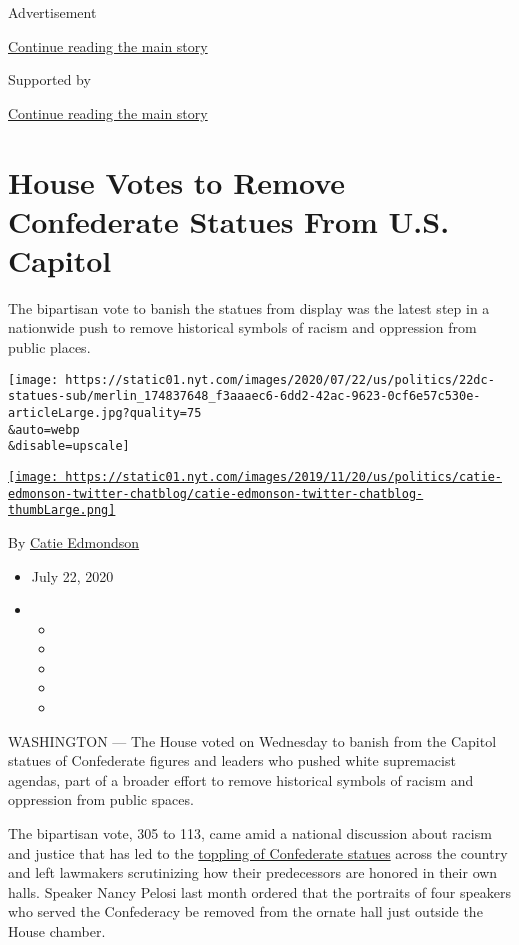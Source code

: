 Advertisement

\protect\hyperlink{after-top}{Continue reading the main story}

Supported by

\protect\hyperlink{after-sponsor}{Continue reading the main story}

\hypertarget{house-votes-to-remove-confederate-statues-from-us-capitol}{%
\section{House Votes to Remove Confederate Statues From U.S.
Capitol}\label{house-votes-to-remove-confederate-statues-from-us-capitol}}

The bipartisan vote to banish the statues from display was the latest
step in a nationwide push to remove historical symbols of racism and
oppression from public places.

\texttt{[image: https://static01.nyt.com/images/2020/07/22/us/politics/22dc-statues-sub/merlin\_174837648\_f3aaaec6-6dd2-42ac-9623-0cf6e57c530e-articleLarge.jpg?quality=75\\\&auto=webp\\\&disable=upscale]}

\href{https://www.nytimes.com/by/catie-edmondson}{\texttt{[image: https://static01.nyt.com/images/2019/11/20/us/politics/catie-edmonson-twitter-chatblog/catie-edmonson-twitter-chatblog-thumbLarge.png]}}

By \href{https://www.nytimes.com/by/catie-edmondson}{Catie Edmondson}

\begin{itemize}
\item
  July 22, 2020
\item
  \begin{itemize}
  \item
  \item
  \item
  \item
  \item
  \end{itemize}
\end{itemize}

WASHINGTON --- The House voted on Wednesday to banish from the Capitol
statues of Confederate figures and leaders who pushed white supremacist
agendas, part of a broader effort to remove historical symbols of racism
and oppression from public spaces.

The bipartisan vote, 305 to 113, came amid a national discussion about
racism and justice that has led to the
\href{https://www.nytimes.com/news-event/confederate-flags-monuments-statues}{toppling
of Confederate statues} across the country and left lawmakers
scrutinizing how their predecessors are honored in their own halls.
Speaker Nancy Pelosi last month ordered that the portraits of four
speakers who served the Confederacy be removed from the ornate hall just
outside the House chamber.

